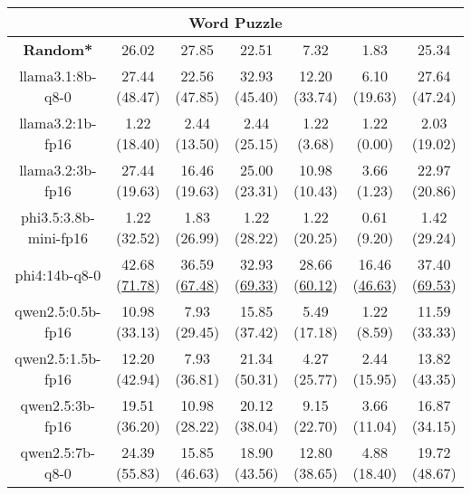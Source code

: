 \begin{table}[hbp]
{\begin{tabular}{ccccccc}
      \hline
      \multicolumn{7}{c}{Word Puzzle} \\ \hline
      \multicolumn{1}{c|}{\textbf{Random*}} & 26.02 & 27.85 & \multicolumn{1}{c|}{22.51} & 7.32 & \multicolumn{1}{c|}{1.83} & 25.34 \\ \hline

      \multicolumn{1}{c|}{llama3.1:8b-q8-0} & 27.44 (48.47) & 22.56 (47.85) & \multicolumn{1}{c|}{32.93 (45.40)} & 12.20 (33.74) & \multicolumn{1}{c|}{6.10 (19.63)} & 27.64 (47.24) \\

      \multicolumn{1}{c|}{llama3.2:1b-fp16} & 1.22 (18.40) & 2.44 (13.50) & \multicolumn{1}{c|}{2.44 (25.15)} & 1.22 (3.68) & \multicolumn{1}{c|}{1.22 (0.00)} & 2.03 (19.02) \\

      \multicolumn{1}{c|}{llama3.2:3b-fp16} & 27.44 (19.63) & 16.46 (19.63) & \multicolumn{1}{c|}{25.00 (23.31)} & 10.98 (10.43) & \multicolumn{1}{c|}{3.66 (1.23)} & 22.97 (20.86) \\

      \multicolumn{1}{c|}{phi3.5:3.8b-mini-fp16} & 1.22 (32.52) & 1.83 (26.99) & \multicolumn{1}{c|}{1.22 (28.22)} & 1.22 (20.25) & \multicolumn{1}{c|}{0.61 (9.20)} & 1.42 (29.24) \\

      \multicolumn{1}{c|}{phi4:14b-q8-0} & 42.68 (\underline{71.78}) & 36.59 (\underline{67.48}) & \multicolumn{1}{c|}{32.93 (\underline{69.33})} & 28.66 (\underline{60.12}) & \multicolumn{1}{c|}{16.46 (\underline{46.63})} & 37.40 (\underline{69.53}) \\

      \multicolumn{1}{c|}{qwen2.5:0.5b-fp16} & 10.98 (33.13) & 7.93 (29.45) & \multicolumn{1}{c|}{15.85 (37.42)} & 5.49 (17.18) & \multicolumn{1}{c|}{1.22 (8.59)} & 11.59 (33.33) \\

      \multicolumn{1}{c|}{qwen2.5:1.5b-fp16} & 12.20 (42.94) & 7.93 (36.81) & \multicolumn{1}{c|}{21.34 (50.31)} & 4.27 (25.77) & \multicolumn{1}{c|}{2.44 (15.95)} & 13.82 (43.35) \\

      \multicolumn{1}{c|}{qwen2.5:3b-fp16} & 19.51 (36.20) & 10.98 (28.22) & \multicolumn{1}{c|}{20.12 (38.04)} & 9.15 (22.70) & \multicolumn{1}{c|}{3.66 (11.04)} & 16.87 (34.15) \\

      \multicolumn{1}{c|}{qwen2.5:7b-q8-0} & 24.39 (55.83) & 15.85 (46.63) & \multicolumn{1}{c|}{18.90 (43.56)} & 12.80 (38.65) & \multicolumn{1}{c|}{4.88 (18.40)} & 19.72 (48.67) \\


\end{tabular}}
\end{table}
